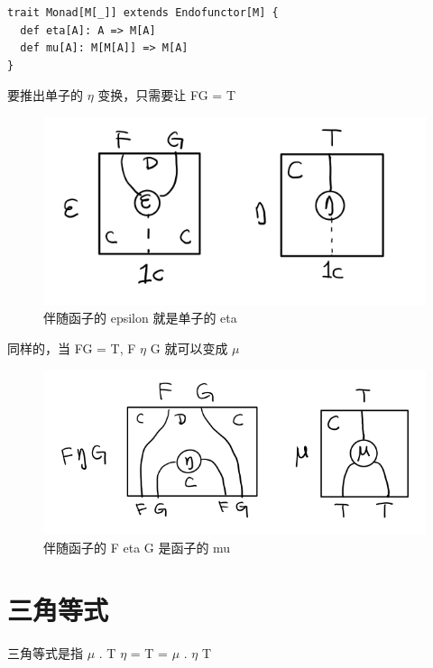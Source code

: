 \documentclass[11pt]{tufte-book}
\begin{document}
\begin{verbatim}
trait Monad[M[_]] extends Endofunctor[M] {
  def eta[A]: A => M[A]
  def mu[A]: M[M[A]] => M[A]
}
\end{verbatim}
要推出单子的 \(\eta\) 变换，只需要让 FG = T
\begin{figure}[htbp]
\centering
\includegraphics[width=.9\linewidth]{images/p1-ajunction-functor-to-monad-eta.png}
\caption{伴随函子的 epsilon 就是单子的 eta}
\end{figure}

同样的，当 FG = T, F \(\eta\) G 就可以变成 \(\mu\)
\begin{figure}[htbp]
\centering
\includegraphics[width=.9\linewidth]{images/p1-ajunction-functor-to-monad-mu.png}
\caption{伴随函子的 F eta G 是函子的 mu}
\end{figure}

\section{三角等式}
\label{sec:org4f1315f}

三角等式是指 \(\mu\) . T \(\eta\) = T = \(\mu\) . \(\eta\) T
\end{document}
